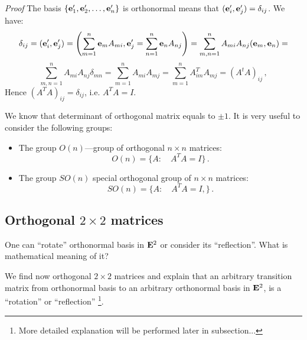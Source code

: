 \documentclass[12pt]{article}
\numberwithin{equation}{section}
\begin{document}
{\sl Proof}
  The basis   $\{{\bf e}'_1,{\bf e}'_2,\dots,{\bf e}'_n\}$ is orthonormal  means that $({\bf e}'_i,{\bf e}'_j)=\delta_{ij}$. We have:
                        $$
\delta_{ij}=({\bf e}'_i,{\bf e}'_j)=\left(\sum_{m=1}^n {\bf e}_m A_{mi},{\bf e}'_j=\sum_{n=1}^n {\bf e}_n A_{nj}\right)=
        \sum_{m,n=1}^n A_{mi}A_{nj}({\bf e}_m,{\bf e}_n)=
                        $$
                        \begin{equation}\label{orthogonmatr1}
\sum_{m,n=1}^n A_{mi}A_{nj}\delta_{mn}=\sum_{m=1}^n A_{mi}A_{mj}=
\sum_{m=1}^n A^T_{im}A_{mj}=(A^tA)_{ij}\,,
\end{equation}
Hence $(A^TA)_{ij}=\delta_{ij}$, i.e. $A^TA=I$.







\m

{\footnotesize   We know that determinant of orthogonal matrix equals to $\pm 1$.
It is very useful to consider the following groups:

 \begin{itemize}

 \item  The group $O(n)$---group of  orthogonal $n\times n$ matrices:
             \begin{equation}\label{orthog.group}
    O(n)=\{A\colon \quad A^T A=I\}\,.
\end{equation}


\item  The group $SO(n)$ special orthogonal group of  $n\times n$ matrices:
             \begin{equation}\label{orthog.group}
    SO(n)=\{A\colon \quad A^T A=I, \}\,.
\end{equation}

\end{itemize}
}




\subsection{Orthogonal $2\times 2$ matrices }

 One can ``rotate'' orthonormal basis  in ${\bf E}^2$ or consider its ``reflection''.
 What is mathematical meaning of it?  
 
 

We find now orthogonal $2\times 2$ matrices and explain that an arbitrary transition matrix from orthonormal basis to an arbitrary orthonormal basis in ${\bf E}^2$,
is a ``rotation'' or ``reflection'' \footnote{More detailed explanation will be performed later in subsection...}.
\end{document}
